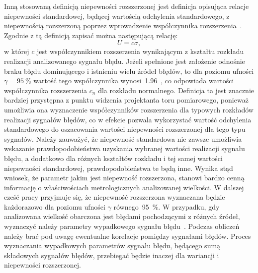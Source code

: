 Inną stosowaną definicją niepewności rozszerzonej jest definicja opisująca relacje niepewności standardowej, będącej wartością odchylenia standardowego, z niepewnością rozszerzoną poprzez wprowadzenie współczynnika rozszerzenia~\cite{jcgm_guide}. Zgodnie z tą definicją zapisać można następującą relację:
\begin{equation}
U = c \sigma \label{eq:unc_sum},
\end{equation}
w której $c$ jest współczynnikiem rozszerzenia wynikającym z kształtu rozkładu realizacji analizowanego sygnału błędu. Jeżeli spełnione jest założenie odnośnie braku błędu dominującego i istnieniu wielu źródeł błędów, to dla poziomu ufności $\gamma = \qty{95}{\percent}$ wartość tego współczynnika wynosi~\num{1.96}~\cite{jcgm_guide}, co odpowiada wartości współczynnika rozszerzenia $c_{n}$ dla rozkładu normalnego. Definicja ta jest znacznie bardziej przystępna z punktu widzenia projektanta toru pomiarowego, ponieważ umożliwia ona wyznaczenie współczynników rozszerzenia dla typowych rozkładów realizacji sygnałów błędów, co w efekcie pozwala wykorzystać wartość odchylenia standardowego do oszacowania wartości niepewności rozszerzonej dla tego typu sygnałów. Należy zauważyć, że niepewność standardowa nie zawsze umożliwia wskazanie prawdopodobieństwa uzyskania wybranej wartości realizacji sygnału błędu, a dodatkowo dla różnych kształtów rozkładu i tej samej wartości niepewności standardowej, prawdopodobieństwa te będą inne. Wynika stąd wniosek, że parametr jakim jest niepewność rozszerzona, stanowi bardzo cenną informację o właściwościach metrologicznych analizowanej wielkości. W dalszej cześć pracy przyjmuje się, że niepewność rozszerzona wyznaczana będzie każdorazowo dla poziomu ufności $\gamma$ równego~\qty{95}{\percent}. W przypadku, gdy analizowana wielkość obarczona jest błędami pochodzącymi z różnych źródeł, wyznaczyć należy parametry wypadkowego sygnału błędu~\cite{wymyslo_range}. Podczas obliczeń należy brać pod uwagę ewentualne korelacje pomiędzy sygnałami błędów. Proces wyznaczania wypadkowych parametrów sygnału błędu, będącego sumą składowych sygnałów błędów, przebiegać będzie inaczej dla wariancji i niepewności rozszerzonej.

